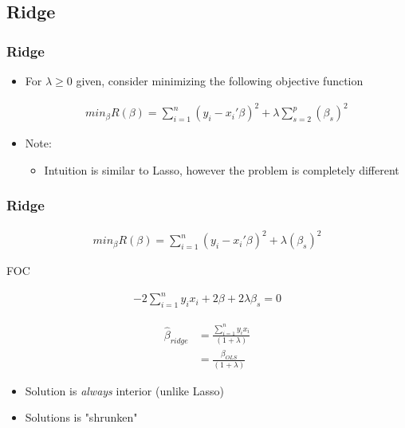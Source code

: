 \documentclass[
  shownotes,
  xcolor={svgnames},
  hyperref={colorlinks,citecolor=DarkBlue,linkcolor=DarkRed,urlcolor=DarkBlue}
  ]{beamer}
\begin{document}
\subsection{Ridge}
\begin{frame}[fragile]
\frametitle{Ridge}

\begin{itemize}
\item For $\lambda \geq 0$ given, consider minimizing the following objective function


\begin{align}
min_{\beta} R(\beta) = \sum_{i=1}^n (y_i-x_i'\beta)^2 + \lambda \sum_{s=2}^p (\beta_s)^2
\end{align}

\bigskip
\item Note:
\begin{itemize}
  \item Intuition is similar to Lasso, however the problem is completely different
\end{itemize}
\end{itemize}


\end{frame}
\begin{frame}[fragile]
\frametitle{Ridge}
\begin{align}
min_{\beta} R(\beta) = \sum_{i=1}^n (y_i-x_i'\beta)^2 + \lambda  (\beta_s)^2
\end{align}

FOC

\begin{align}
-2 \sum_{i=1}^n  y_i x_i + 2\beta + 2 \lambda  \beta_s =0
\end{align}

\begin{align}
\hat{\beta}_{ridge} &= \frac{\sum_{i=1}^n  y_i x_i}{(1+ \lambda)} \nonumber \\
                    &= \frac{\beta_{OLS}}{(1+ \lambda)}
\end{align}

\begin{itemize}
\item Solution is {\it always} interior (unlike Lasso)
\item Solutions is "shrunken"
\end{itemize}
\end{frame}
\end{document}
